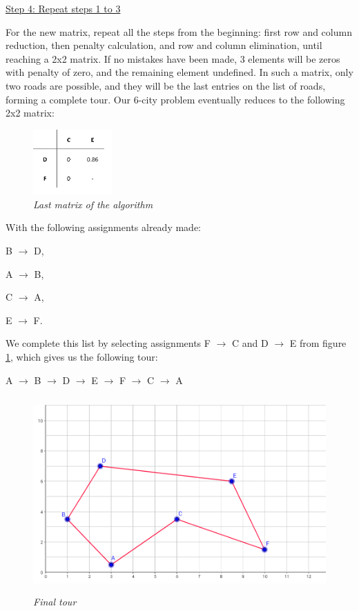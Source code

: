 \vspace{5mm}
\noindent
\underline{Step 4: Repeat steps 1 to 3}
\vspace{1mm}

\noindent
For the new matrix, repeat all the steps from the beginning: first row and column reduction, then penalty calculation, and row and column elimination, until reaching a 2x2 matrix. If no mistakes have been made, 3 elements will be zeros with penalty of zero, and the remaining element undefined. In such a matrix, only two roads are possible, and they will be the last entries on the list of roads, forming a complete tour. Our 6-city problem eventually reduces to the following 2x2 matrix:

\begin{figure}[H] 
	\centering
	\includegraphics[height=2.5cm]{2x2matrix}
	\vspace{-3mm}
	\caption{\textsl{Last matrix of the algorithm}}
	\label{2x2matrix}
\end{figure}

\noindent
With the following assignments already made:

\begin{center}
\par B $\rightarrow$ D, 
\par A $\rightarrow$ B, 
\par C $\rightarrow$ A, 
\par E $\rightarrow$ F.
\end{center}
\noindent
We complete this list by selecting assignments F $\rightarrow$ C and D $\rightarrow$ E from figure \ref{2x2matrix}, which gives us the following tour:

\begin{center}
A $\rightarrow$ B $\rightarrow$ D $\rightarrow$ E $\rightarrow$ F $\rightarrow$ C $\rightarrow$ A
\end{center}


\begin{figure}[ht] 
	\centering
	\includegraphics[height=7.5cm]{6citytour}
	\caption{\textsl{Final tour}}
	\label{6citytour}
\end{figure}

